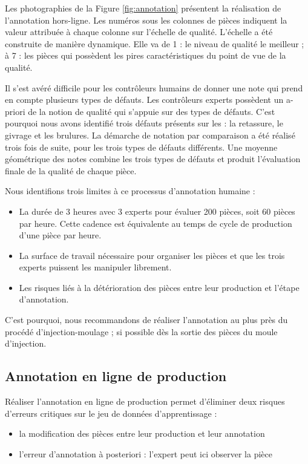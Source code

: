 Les photographies de la Figure \ref{fig:annotation} présentent la réalisation de l'annotation hors-ligne.
Les numéros sous les colonnes de pièces indiquent la valeur attribuée à chaque colonne sur l'échelle de qualité.
L'échelle a été construite de manière dynamique.
Elle va de 1 : le niveau de qualité le meilleur ; à 7 : les pièces qui possèdent les pires caractéristiques du point de vue de la qualité.

Il s'est avéré difficile pour les contrôleurs humains de donner une note qui prend en compte plusieurs types de défauts.
Les contrôleurs experts possèdent un a-priori de la notion de qualité qui s'appuie sur des types de défauts.
C'est pourquoi nous avons identifié trois défauts présents sur les : la retassure, le givrage et les brulures.
La démarche de notation par comparaison a été réalisé trois fois de suite, pour les trois types de défauts différents.
Une moyenne géométrique des notes combine les trois types de défauts et produit l'évaluation finale de la qualité de chaque pièce.

\noindent
Nous identifions trois limites à ce processus d'annotation humaine :
\begin{itemize}
\item La durée de 3 heures avec 3 experts pour évaluer 200 pièces, soit 60 pièces par heure. Cette cadence est équivalente au temps de cycle de production d'une pièce par heure.
\item La surface de travail nécessaire pour organiser les pièces et que les trois experts puissent les manipuler librement.
\item Les risques liés à la détérioration des pièces entre leur production et l'étape d'annotation.
\end{itemize}
C'est pourquoi, nous recommandons de réaliser l'annotation au plus près du procédé d'injection-moulage ; si possible dès la sortie des pièces du moule d'injection.

\subsection{Annotation en ligne de production}
Réaliser l'annotation en ligne de production permet d'éliminer deux risques d'erreurs critiques sur le jeu de données d'apprentissage :
\begin{itemize}
    \item la modification des pièces entre leur production et leur annotation
    \item l'erreur d'annotation à posteriori : l'expert peut ici observer la pièce
\end{itemize}

